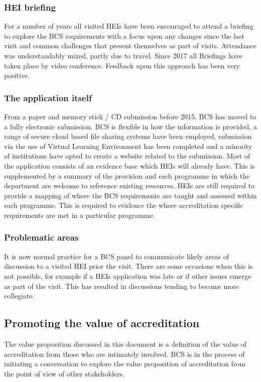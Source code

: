 \documentclass[sigconf]{acmart}
\begin{document}
\subsubsection{HEI briefing}
For a number of years all visited HEIs have been encouraged to attend a briefing to explore the BCS requirements with a focus upon any changes since the last visit and common challenges that present themselves as part of visits. Attendance was understandably mixed, partly due to travel. Since 2017 all Briefings have taken place by video conference. Feedback upon this approach has been very positive.

\subsubsection{The application itself}
From a paper and memory stick / CD submission before 2015, BCS has moved to a fully electronic submission. BCS is flexible in how the information is provided, a range of secure cloud based file sharing systems have been employed, submission via the use of Virtual Learning Environment has been completed and a minority of institutions have opted to create a website related to the submission. Most of the application consists of an evidence base which HEIs will already have. This is supplemented by a summary of the provision and each programme in which the department are welcome to reference existing resources. HEIs are still required to provide a mapping of where the BCS requirements are taught and assessed within each programme. This is required to evidence the where accreditation specific requirements are met in a particular programme.

\subsubsection{Problematic areas}
It is now normal practice for a BCS panel to communicate likely areas of discussion to a visited HEI prior the visit. There are some occasions when this is not possible, for example if a HEIs application was late or if other issues emerge as part of the visit.   This has resulted in discussions tending to become more collegiate. 

\subsection{Promoting the value of accreditation}
The value proposition discussed in this document is a definition of the value of accreditation from those who are intimately involved. BCS is in the process of initiating a conversation to explore the value proposition of accreditation from the point of view of other stakeholders.
\end{document}

